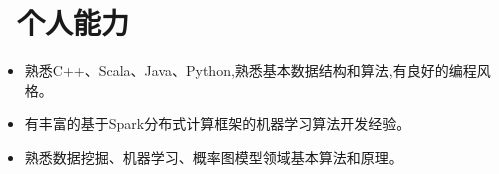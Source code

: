 \documentclass{resume}
\begin{document}

\section{\faCogs\ 个人能力}
\begin{itemize}[parsep=0.5ex]
  \item 熟悉C++、Scala、Java、Python,熟悉基本数据结构和算法,有良好的编程风格。
  \item 有丰富的基于Spark分布式计算框架的机器学习算法开发经验。
  \item 熟悉数据挖掘、机器学习、概率图模型领域基本算法和原理。
\end{itemize}


%
%
\end{document}
